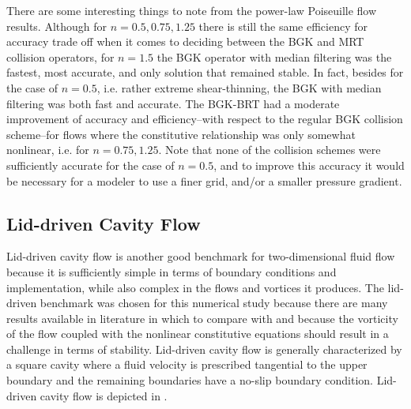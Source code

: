 \documentclass{article}
\begin{document}
There are some interesting things to note from the power-law Poiseuille flow results.
Although for $n = 0.5, 0.75, 1.25$ there is still the same efficiency for accuracy trade off when it comes to deciding between the BGK and MRT collision operators, for $n = 1.5$ the BGK operator with median filtering was the fastest, most accurate, and only solution that remained stable.
In fact, besides for the case of $n = 0.5$, i.e. rather extreme shear-thinning, the BGK with median filtering was both fast and accurate.
The BGK-BRT had a moderate improvement of accuracy and efficiency--with respect to the regular BGK collision scheme--for flows where the constitutive relationship was only somewhat nonlinear, i.e. for $n = 0.75, 1.25$.
Note that none of the collision schemes were sufficiently accurate for the case of $n = 0.5$, and to improve this accuracy it would be necessary for a modeler to use a finer grid, and/or a smaller pressure gradient.

\subsection{Lid-driven Cavity Flow} %

Lid-driven cavity flow is another good benchmark for two-dimensional fluid flow because it is sufficiently simple in terms of boundary conditions and implementation, while also complex in the flows and vortices it produces.
The lid-driven benchmark was chosen for this numerical study because there are many results available in literature in which to compare with and because the vorticity of the flow coupled with the nonlinear constitutive equations should result in a challenge in terms of stability.
Lid-driven cavity flow is generally characterized by a square cavity where a fluid velocity is prescribed tangential to the upper boundary and the remaining boundaries have a no-slip boundary condition.
Lid-driven cavity flow is depicted in .
\end{document}
